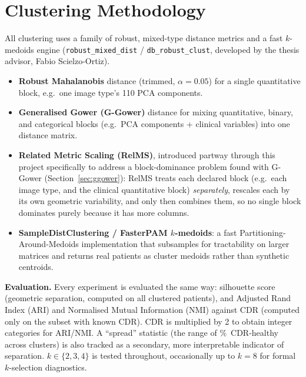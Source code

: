 \documentclass[11pt, a4paper]{article}
\begin{document}
\section{Clustering Methodology}

All clustering uses a family of robust, mixed-type distance metrics and a fast $k$-medoids engine
(\texttt{robust\_mixed\_dist} / \texttt{db\_robust\_clust}, developed by the thesis advisor, Fabio
Scielzo-Ortiz).

\begin{itemize}[leftmargin=1.4em]
    \item \textbf{Robust Mahalanobis} distance (trimmed, $\alpha=0.05$) for a single quantitative
    block, e.g.\ one image type's 110 PCA components.
    \item \textbf{Generalised Gower (G-Gower)} distance for mixing quantitative, binary, and
    categorical blocks (e.g.\ PCA components + clinical variables) into one distance matrix.
    \item \textbf{Related Metric Scaling (RelMS)}, introduced partway through this project
    specifically to address a block-dominance problem found with G-Gower (Section~\ref{sec:ggower}):
    RelMS treats each declared block (e.g.\ each image type, and the clinical quantitative block)
    \emph{separately}, rescales each by its own geometric variability, and only then combines them,
    so no single block dominates purely because it has more columns.
    \item \textbf{SampleDistClustering / FasterPAM $k$-medoids}: a fast Partitioning-Around-Medoids
    implementation that subsamples for tractability on larger matrices and returns real patients as
    cluster medoids rather than synthetic centroids.
\end{itemize}

\textbf{Evaluation.} Every experiment is evaluated the same way: silhouette score (geometric
separation, computed on all clustered patients), and Adjusted Rand Index (ARI) and Normalised
Mutual Information (NMI) against CDR (computed only on the subset with known CDR). CDR is
multiplied by 2 to obtain integer categories for ARI/NMI. A ``spread'' statistic (the range of
\%~CDR-healthy across clusters) is also tracked as a secondary, more interpretable indicator of
separation. $k \in \{2,3,4\}$ is tested throughout, occasionally up to $k=8$ for formal
$k$-selection diagnostics.

\end{document}
